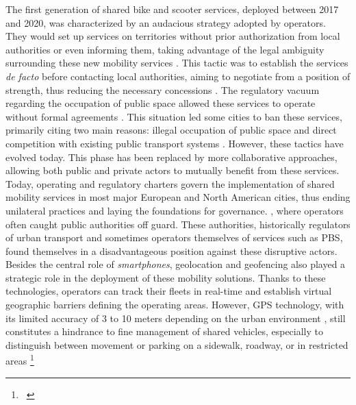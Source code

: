 \begin{refsegment}
{    The first generation of shared bike and scooter services, deployed between 2017 and 2020, was characterized by an audacious strategy adopted by operators. They would set up services on territories without prior authorization from local authorities or even informing them, taking advantage of the legal ambiguity surrounding these new mobility services \textcolor{blue}{\autocite{laker_welcome_2019}}. This tactic was to establish the services \textsl{de facto} before contacting local authorities, aiming to negotiate from a position of strength, thus reducing the necessary concessions \textcolor{blue}{\autocite[5]{lopez-escolano_mobilites_2019}}. The regulatory vacuum regarding the occupation of public space allowed these services to operate without formal agreements \textcolor{blue}{\autocite[5]{lopez-escolano_mobilites_2019}}. This situation led some cities to ban these services, primarily citing two main reasons: illegal occupation of public space and direct competition with existing public transport systems \textcolor{blue}{\autocite[63]{6t-bureau_de_recherche_livre_2019}}. However, these tactics have evolved today. This phase has been replaced by more collaborative approaches, allowing both public and private actors to mutually benefit from these services. Today, operating and regulatory charters govern the implementation of shared mobility services in most major European and North American cities, thus ending unilateral practices and laying the foundations for governance.
}, where operators often caught public authorities off guard. These authorities, historically regulators of urban transport and sometimes operators themselves of services such as \acrshort{PBS}, found themselves in a disadvantageous position against these disruptive actors. Besides the central role of \textsl{smartphones}, geolocation and geofencing also played a strategic role in the deployment of these mobility solutions. Thanks to these technologies, operators can track their fleets in real-time and establish virtual geographic barriers defining the operating areas. However, \acrshort{GPS} technology, with its limited accuracy of 3 to 10 meters depending on the urban environment \textcolor{blue}{\autocite{the_scooterist_dockless_2020}}, still constitutes a hindrance to fine management of shared vehicles, especially to distinguish between movement or parking on a sidewalk, roadway, or in restricted areas \textcolor{blue}{\autocite[96]{6t-bureau_de_recherche_livre_2019}}\footnote{~
}
\end{refsegment}
